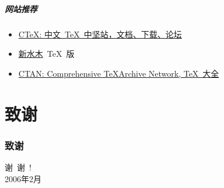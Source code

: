 \begin{frame}
    \frametitle{网站推荐}
    \begin{itemize}
	\item \href{http://www.ctex.org}{C\TeX: 中文~\TeX~中坚站，文档、下载、论坛}
	\item \href{http://www.newsmth.net}{新水木}~\TeX~版
	\item \href{http://www.ctan.org}{CTAN: Comprehensive \TeX Archive Network, \TeX~大全}
    \end{itemize}
\end{frame}
\part{致谢}
\section*{致谢}

\begin{frame}%
    \vfill
    
    \begin{center}
	\Huge\noindent 谢~谢~!\\
	\vfill
	\large 2006年2月
    \end{center}

    \vfill
\end{frame}


